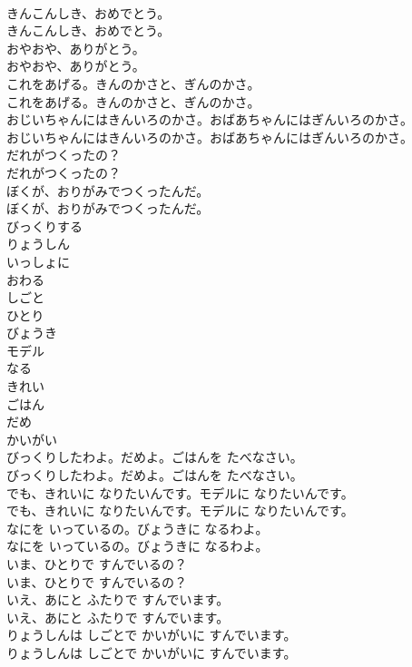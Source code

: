 \documentclass[8pt]{extreport}
\begin{document}
\begin{CJK}{UTF8}{min}
\\	きんこんしき、おめでとう。
\\	きんこんしき、おめでとう。
\\	おやおや、ありがとう。
\\	おやおや、ありがとう。
\\	これをあげる。きんのかさと、ぎんのかさ。
\\	これをあげる。きんのかさと、ぎんのかさ。
\\	おじいちゃんにはきんいろのかさ。おばあちゃんにはぎんいろのかさ。
\\	おじいちゃんにはきんいろのかさ。おばあちゃんにはぎんいろのかさ。
\\	だれがつくったの？
\\	だれがつくったの？
\\	ぼくが、おりがみでつくったんだ。
\\	ぼくが、おりがみでつくったんだ。
\\	びっくりする
\\	りょうしん
\\	いっしょに
\\	おわる
\\	しごと
\\	ひとり
\\	びょうき
\\	モデル
\\	なる
\\	きれい
\\	ごはん
\\	だめ
\\	かいがい
\\	びっくりしたわよ。だめよ。ごはんを たべなさい。
\\	びっくりしたわよ。だめよ。ごはんを たべなさい。
\\	でも、きれいに なりたいんです。モデルに なりたいんです。
\\	でも、きれいに なりたいんです。モデルに なりたいんです。
\\	なにを いっているの。びょうきに なるわよ。
\\	なにを いっているの。びょうきに なるわよ。
\\	いま、ひとりで すんでいるの？
\\	いま、ひとりで すんでいるの？
\\	いえ、あにと ふたりで すんでいます。
\\	いえ、あにと ふたりで すんでいます。
\\	りょうしんは しごとで かいがいに すんでいます。
\\	りょうしんは しごとで かいがいに すんでいます。

\end{CJK}
\end{document}
